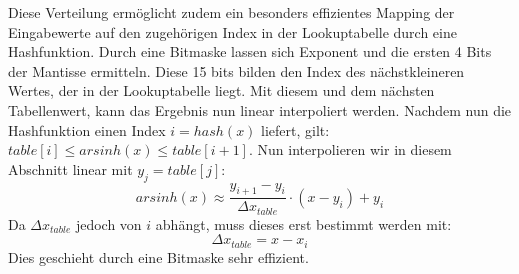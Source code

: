 \documentclass[course=erap] {aspdoc}
\begin{document}
     Diese Verteilung ermöglicht zudem ein besonders effizientes Mapping der Eingabewerte auf den zugehörigen Index in der Lookuptabelle durch eine Hashfunktion. Durch eine Bitmaske lassen sich Exponent und die ersten 4 Bits der Mantisse ermitteln. Diese 15 bits bilden den Index des nächstkleineren Wertes, der in der Lookuptabelle liegt. Mit diesem und dem nächsten Tabellenwert, kann das Ergebnis nun linear interpoliert werden.
     Nachdem nun die Hashfunktion einen Index $i=hash(x)$ liefert, gilt: $table[i] \leq arsinh(x) \leq table[i+1]$. 
     Nun interpolieren wir in diesem Abschnitt linear mit $y_j = table[j]$:
     \[
         arsinh(x) \approx \frac{y_{i+1}-y_i}{\Delta x_{table}}\cdot (x-y_i) + y_i
     \]
     Da $\Delta x_{table}$ jedoch von $i$ abhängt, muss dieses erst bestimmt werden mit:
     \[
            \Delta x_{table} = x - x_i
     \]
     Dies geschieht durch eine Bitmaske sehr effizient.
     
     
 
 
 
     
 
 
\end{document}

